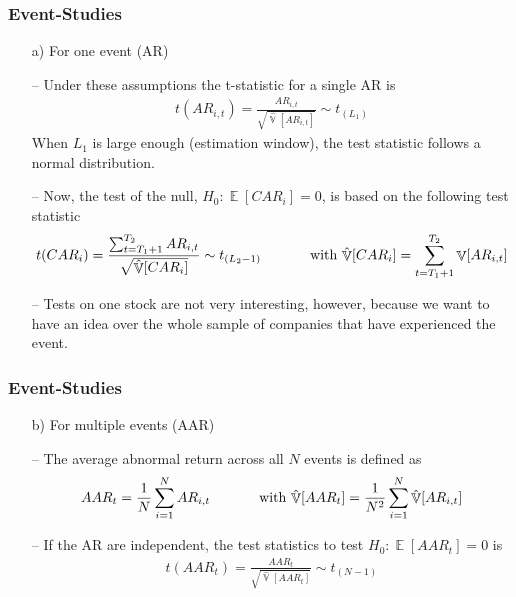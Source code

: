 \documentclass[xcolor=dvipsnames, english, 8pt]{beamer}
\DeclareMathOperator{\E}{\mathbb{E}}
\DeclareMathOperator{\V}{\mathbb{V}}
\begin{document}
        \begin{frame}
            \frametitle{Event-Studies}

        \begin{enumerate}
            \item[a)] For one event (AR)\vspace{0.25cm}\\
                \item[--] Under these assumptions the t-statistic for a single AR is
                \begin{align}
                    t(AR_{i,t}) = \frac{AR_{i,t}}{\sqrt{\hat{\V}[AR_{i,t}]}} \sim t_{(L_1)}
                \end{align}
        When $L_1$ is large enough (estimation window), the test statistic follows a normal distribution.
            \item[--] Now, the test of the null, $H_0:\E[CAR_i]=0$, is based on the following test statistic
            \begin{align}
                t(CAR_i) = \frac{\sum_{t=T_1+1}^{T_2} AR_{i,t}}{\sqrt{\hat{\V}[CAR_{i}]}} \sim t_{(L_2-1)} \text{ \hspace{1cm} with } \hat{\V}[CAR_{i}] = \sum_{t=T_1+1}^{T_2} \V[AR_{i,t}]
            \end{align}
            \item[--] Tests on one stock are not very interesting, however, because we want to have an
        idea over the whole sample of companies that have experienced the event.
        \end{enumerate}
        \end{frame}

        \begin{frame}
            \frametitle{Event-Studies}

        \begin{enumerate}
            \item[b)] For multiple events (AAR)\vspace{0.25cm}\\
            \item[--] The average abnormal return across all $N$ events is defined as
            \begin{align}
                AAR_t = \frac{1}{N} \sum_{i=1}^N AR_{i,t}  \text{ \hspace{1cm} with } \hat{\V}[AAR_{t}] = \frac{1}{N^2}\sum_{i=1}^N \hat{\V}[AR_{i,t}]
            \end{align}
        \item[--] If the AR are independent, the test statistics  to test $H_0:\E[AAR_t]=0$ is
        \begin{align}
            t(AAR_t) = \frac{AAR_t}{\sqrt{\hat{\V}[AAR_{t}]}} \sim t_{(N-1)}
        \end{align}
        \end{enumerate}
        \end{frame}
\end{document}
